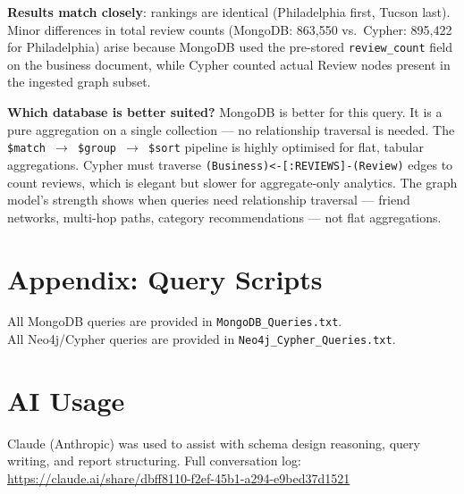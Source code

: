 \documentclass[12pt,a4paper]{article}
\newcommand{\code}[1]{\texttt{#1}}
\begin{document}
\textbf{Results match closely}: rankings are identical (Philadelphia first,
Tucson last). Minor differences in total review counts (MongoDB: 863,550 vs.\
Cypher: 895,422 for Philadelphia) arise because MongoDB used the pre-stored
\code{review\_count} field on the business document, while Cypher counted
actual Review nodes present in the ingested graph subset.

\textbf{Which database is better suited?} MongoDB is better for this query.
It is a pure aggregation on a single collection --- no relationship traversal
is needed. The \code{\$match $\to$ \$group $\to$ \$sort} pipeline is highly
optimised for flat, tabular aggregations. Cypher must traverse
\code{(Business)<-[:REVIEWS]-(Review)} edges to count reviews, which is elegant
but slower for aggregate-only analytics. The graph model's strength shows when
queries need relationship traversal --- friend networks, multi-hop paths,
category recommendations --- not flat aggregations.

\section*{Appendix: Query Scripts}

All MongoDB queries are provided in \code{MongoDB\_Queries.txt}.\\
All Neo4j/Cypher queries are provided in \code{Neo4j\_Cypher\_Queries.txt}.

\section*{AI Usage}

Claude (Anthropic) was used to assist with schema design reasoning, query
writing, and report structuring. Full conversation log:\\
\url{https://claude.ai/share/dbff8110-f2ef-45b1-a294-e9bed37d1521}
\end{document}
